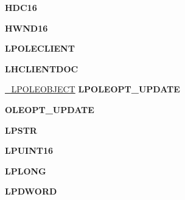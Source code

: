 \begin{DoxyCompactItemize}
\mbox{\label{struct___o_l_e_o_b_j_e_c_t_v_t_b_l_a5a4ada1685205eddd4d9cfef159f6eef}} 
{\bfseries H\+D\+C16}
\item 
\mbox{\label{struct___o_l_e_o_b_j_e_c_t_v_t_b_l_afa44a21e304ce9141a442a8ffc9917d7}} 
{\bfseries H\+W\+N\+D16}
\item 
\mbox{\label{struct___o_l_e_o_b_j_e_c_t_v_t_b_l_a08a1b78bcadaf53805710036bba5256b}} 
{\bfseries L\+P\+O\+L\+E\+C\+L\+I\+E\+NT}
\item 
\mbox{\label{struct___o_l_e_o_b_j_e_c_t_v_t_b_l_a4c71df0c813aaedbcc6218f7348565af}} 
{\bfseries L\+H\+C\+L\+I\+E\+N\+T\+D\+OC}
\item 
\mbox{\label{struct___o_l_e_o_b_j_e_c_t_v_t_b_l_a097e79819c64729933635b198e2e2f65}} 
\hyperlink{struct___o_l_e_o_b_j_e_c_t}{\+\_\+\+L\+P\+O\+L\+E\+O\+B\+J\+E\+CT} {\bfseries L\+P\+O\+L\+E\+O\+P\+T\+\_\+\+U\+P\+D\+A\+TE}
\item 
\mbox{\label{struct___o_l_e_o_b_j_e_c_t_v_t_b_l_ab9fbcd0d5a39b2c53abb2098b38e5232}} 
{\bfseries O\+L\+E\+O\+P\+T\+\_\+\+U\+P\+D\+A\+TE}
\item 
\mbox{\label{struct___o_l_e_o_b_j_e_c_t_v_t_b_l_a6eb1cc8eaca1266cd4a1c669d77933f9}} 
{\bfseries L\+P\+S\+TR}
\item 
\mbox{\label{struct___o_l_e_o_b_j_e_c_t_v_t_b_l_af6c1a9dcfe67c025e104cb39b677bac7}} 
{\bfseries L\+P\+U\+I\+N\+T16}
\item 
\mbox{\label{struct___o_l_e_o_b_j_e_c_t_v_t_b_l_a0ee01b003f47b0a46945e95d1bd21688}} 
{\bfseries L\+P\+L\+O\+NG}
\item 
\mbox{\label{struct___o_l_e_o_b_j_e_c_t_v_t_b_l_a4676d72f410849e8645d2e494490e7b3}} 
{\bfseries L\+P\+D\+W\+O\+RD}
\item 
\mbox{\label{struct___o_l_e_o_b_j_e_c_t_v_t_b_l_a89284f1cad181419990a70a8ec867dbf}} 

\end{DoxyCompactItemize}
